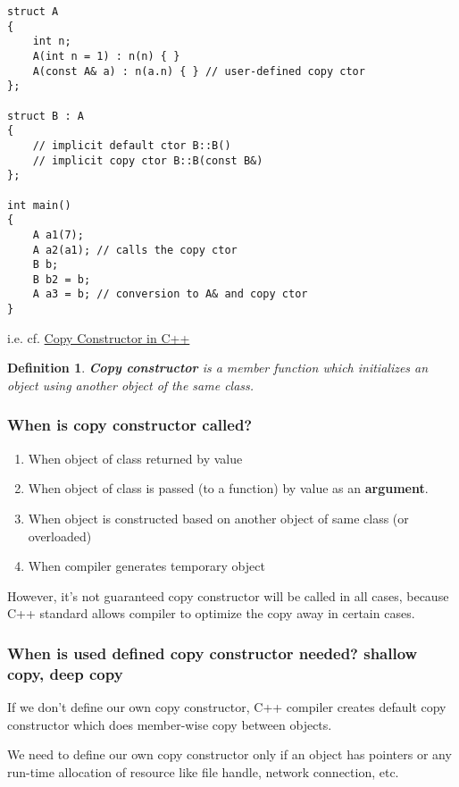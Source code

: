 \documentclass[10pt]{amsart}
\newtheorem{definition}{Definition}
\begin{document}
\begin{multicols*}{2}
\begin{lstlisting}
struct A
{
	int n;
	A(int n = 1) : n(n) { }
	A(const A& a) : n(a.n) { } // user-defined copy ctor
};

struct B : A
{
	// implicit default ctor B::B()
	// implicit copy ctor B::B(const B&)
};

int main()
{
	A a1(7);
	A a2(a1); // calls the copy ctor
	B b;
	B b2 = b;
	A a3 = b; // conversion to A& and copy ctor  
}
\end{lstlisting}  

i.e. cf. \href{http://www.geeksforgeeks.org/copy-constructor-in-cpp/}{Copy Constructor in C++}

\begin{definition}
	\textbf{Copy constructor} is a member function which initializes an object using another object of the same class.  
\end{definition}

\subsubsection{When is copy constructor called? } 
\begin{enumerate}
\item When object of class returned by value 
\item When object of class is passed (to a function) by value as an \textbf{argument}.  
\item When object is constructed based on another object of same class  (or overloaded)  
\item When compiler generates temporary object  
\end{enumerate}


However, it's not guaranteed copy constructor will be called in all cases, because C++ standard allows compiler to optimize the copy away in certain cases.  

\subsubsection{When is used defined copy constructor needed?  shallow copy, deep copy}  

If we don't define our own copy constructor, C++ compiler creates default copy constructor which does member-wise copy between objects.  

We need to define our own copy constructor only if an object has pointers or any run-time allocation of resource like file handle, network connection, etc.  


\end{multicols*}
\end{document}
